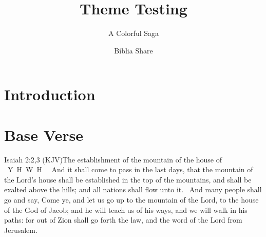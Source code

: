 \documentclass{beamer}
\title{Theme Testing}
\subtitle{A Colorful Saga}
\author{Bíblia Share}
\date{\space}%
\newcommand{\YA}{%
    \mbox{%
        Y\makebox[0pt][l]{\hspace{-0.178em}\raisebox{-0.00ex}{\scalebox{0.30}{E}}}%
        H\makebox[0pt][l]{\hspace{-0.010em}\raisebox{-0.00ex}{\scalebox{0.30}{O}}}%
        W\makebox[0pt][l]{\hspace{-0.245em}\raisebox{-0.00ex}{\scalebox{0.30}{A}}}%
        H%
    }%
}
\newcommand{\ver}[1]{\raisebox{0.75ex}{\pmb{\textbf{\textcolor{white}{#1}}}}}
\newcommand{\RED}[1]{\textcolor{TXred}{#1}}
\begin{document}
    \begin{frame}
        \titlepage
    \end{frame}

    \section{Introduction}

    \section{Base Verse}

    \begin{frame}{Isaiah 2:2,3 (KJV)}{The establishment of the mountain of the house of \YA}
        \linespread{1.25}\Large
        \ver{2}~And \RED{it shall come to pass} in the last days, that the mountain of the
        Lord's house shall be \alert{established} in the top of the mountains, and shall be
        \alert{exalted} above the hills; and \alert{all nations} shall flow unto it.
        \ver{3}~And many people shall go and say, Come ye, and let us go up to the mountain of
        the Lord, to the house of the God of Jacob; and he will teach us of his ways, and we
        will walk in his paths: for out of Zion shall go forth the law, and the word of the Lord
        from Jerusalem.
    \end{frame}
\end{document}
